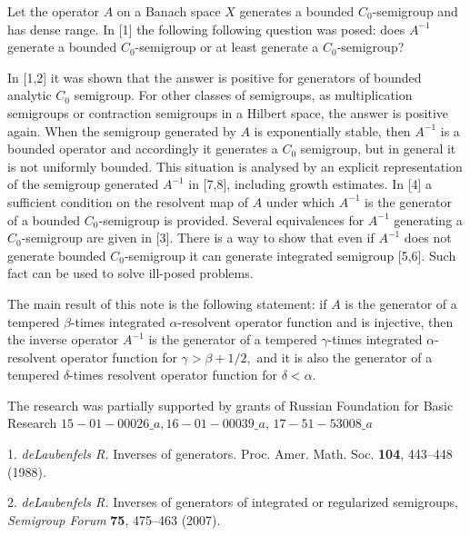 




Let the operator $A$ on a Banach space $X$ generates a bounded $C_0$-semigroup
and has dense range. In [1] the following following question was posed: does
$A^{-1}$ generate a bounded $C_0$-semigroup or at least generate a $C_0$-semigroup?

In [1,2] it was shown  that the answer is positive for generators of bounded
analytic $C_0$ semigroup.  For other classes of semigroups, as multiplication
semigroups or contraction semigroups in a Hilbert space, the answer is positive again.
When the semigroup generated by $A$ is exponentially stable, then $A^{-1}$ is a
bounded operator and accordingly it generates a  $C_0$ semigroup, but in general
it is not uniformly bounded. This situation is analysed by an explicit representation
of the semigroup generated $A^{-1}$ in [7,8], including growth estimates.
In [4] a sufficient condition on the resolvent map of $A$ under which $A^{-1}$
is the generator of a bounded  $C_0$-semigroup is provided. Several equivalences
for $A^{-1}$ generating a $C_0$-semigroup are given in [3]. There is a way to
show that even if $A^{-1}$ does not generate bounded $C_0$-semigroup it can generate
integrated semigroup [5,6]. Such fact can be used to solve ill-posed problems.

The main result of this note is  the following statement: if $A$ is the generator
of a tempered $\beta$-times integrated $\alpha$-resolvent operator function and
is injective, then the inverse operator $A^{-1}$ is the generator of a tempered
$\gamma$-times integrated $\alpha$-resolvent operator function for
$\gamma > \beta+1/2,$ and it is also the generator of a tempered $\delta$-times
resolvent operator function for $\delta < \alpha.$


The research was partially  supported by grants of Russian Foundation
for Basic Research  $15-01-00026\_a, 16-01-00039\_a$,
 $17-51-53008{\_}a$



\litlist

1. {\it  deLaubenfels R.} Inverses of generators. Proc. Amer. Math. Soc. \textbf{104}, 443--448 (1988).

2. {\it  deLaubenfels R.} Inverses of generators of integrated or regularized semigroups,
\emph{Semigroup Forum} \textbf{75}, 475--463  (2007).

